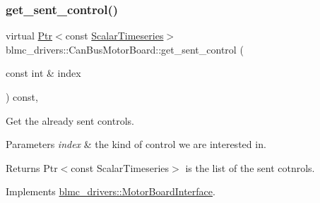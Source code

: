\mbox{\label{classblmc__drivers_1_1CanBusMotorBoard_aa71ed313381440d9c2af00c5a13d6faa}} 
\subsubsection{\texorpdfstring{get\+\_\+sent\+\_\+control()}{get\_sent\_control()}}
{\footnotesize\ttfamily virtual \hyperlink{classblmc__drivers_1_1MotorBoardInterface_a6a733b7ed7a3a96f6b0712b6bb5307f8}{Ptr}$<$const \hyperlink{classblmc__drivers_1_1MotorBoardInterface_a14e237254ba495a66091ea3a3a33fa75}{Scalar\+Timeseries}$>$ blmc\+\_\+drivers\+::\+Can\+Bus\+Motor\+Board\+::get\+\_\+sent\+\_\+control (\begin{DoxyParamCaption}\item[{const int \&}]{index }\end{DoxyParamCaption}) const\hspace{0.3cm}{\ttfamily [inline]}, {\ttfamily [virtual]}}



Get the already sent controls. 


\begin{DoxyParams}{Parameters}
{\em index} & the kind of control we are interested in. \\
\hline
\end{DoxyParams}
\begin{DoxyReturn}{Returns}
Ptr$<$const Scalar\+Timeseries$>$ is the list of the sent cotnrols. 
\end{DoxyReturn}


Implements \hyperlink{classblmc__drivers_1_1MotorBoardInterface_a8dc6222e915fc96d89b13cbb0fcb0cda}{blmc\+\_\+drivers\+::\+Motor\+Board\+Interface}.

\mbox{\label{classblmc__drivers_1_1CanBusMotorBoard_a7e62dd5126422cfbf587f9c265374fdc}} 
